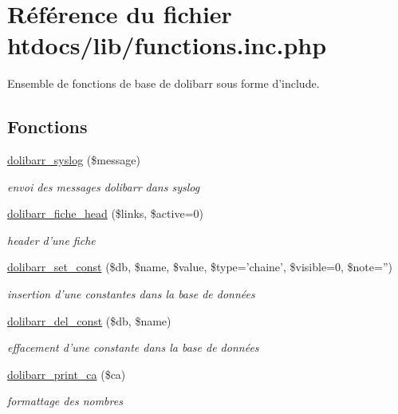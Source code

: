 \hypertarget{functions_8inc_8php}{
\section{R\'{e}f\'{e}rence du fichier htdocs/lib/functions.inc.php}
\label{functions_8inc_8php}
}
Ensemble de fonctions de base de dolibarr sous forme d'include.  


\subsection*{Fonctions}
\begin{CompactItemize}
\item 
\hyperlink{functions_8inc_8php_a1}{dolibarr\_\-syslog} (\$message)
\begin{CompactList}\small\item\em envoi des messages dolibarr dans syslog \item\end{CompactList}\item 
\hyperlink{functions_8inc_8php_a2}{dolibarr\_\-fiche\_\-head} (\$links, \$active=0)
\begin{CompactList}\small\item\em header d'une fiche \item\end{CompactList}\item 
\hyperlink{functions_8inc_8php_a3}{dolibarr\_\-set\_\-const} (\$db, \$name, \$value, \$type='chaine', \$visible=0, \$note='')
\begin{CompactList}\small\item\em insertion d'une constantes dans la base de donn\'{e}es \item\end{CompactList}\item 
\hyperlink{functions_8inc_8php_a4}{dolibarr\_\-del\_\-const} (\$db, \$name)
\begin{CompactList}\small\item\em effacement d'une constante dans la base de donn\'{e}es \item\end{CompactList}\item 
\hyperlink{functions_8inc_8php_a5}{dolibarr\_\-print\_\-ca} (\$ca)
\begin{CompactList}\small\item\em formattage des nombres \item\end{CompactList}\item 

\end{CompactItemize}
